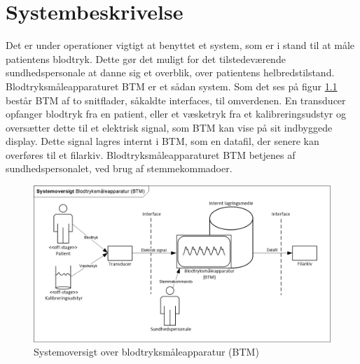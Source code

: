 \chapter{Systembeskrivelse}
Det er under operationer vigtigt at benyttet et system, som er i stand til at måle patientens blodtryk. Dette gør det muligt for det tilstedeværende sundhedspersonale at danne sig et overblik, over patientens helbredstilstand. Blodtryksmåleapparaturet BTM er et sådan system. Som det ses på figur \ref{fig:Systemoversigt} består BTM af to snitflader, såkaldte interfaces, til omverdenen. En transducer opfanger blodtryk fra en patient, eller et væsketryk fra et kalibreringsudstyr og oversætter dette til et elektrisk signal, som BTM kan vise på sit indbyggede display. Dette signal lagres internt i BTM, som en datafil, der senere kan overføres til et filarkiv. Blodtryksmåleapparaturet BTM betjenes af sundhedspersonalet, ved brug af stemmekommadoer. 
\begin{figure}[htbp]
\centering
\includegraphics[width=1.00\textwidth]{billeder/Systemoversigt.png}
\caption{Systemoversigt over blodtryksmåleapparatur (BTM)}
\label{fig:Systemoversigt}
\end{figure}
